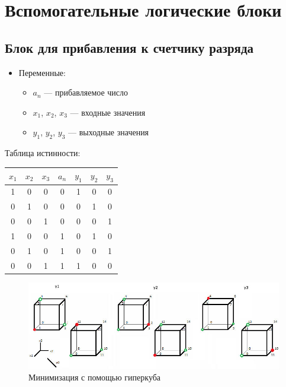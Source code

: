 \documentclass[utf8x, 12pt]{G7-32}
\begin{document}
\newpage

\section{Вспомогательные логические блоки}

\subsection{Блок для прибавления к счетчику разряда}

\begin{itemize}
	\item Переменные:
		\begin{itemize}
			\item $a_n$ --- прибавляемое число
			\item $x_1$, $x_2$, $x_3$  --- входные значения
			\item $y_1$, $y_2$, $y_3$ --- выходные значения
		\end{itemize}
			
\end{itemize}

\bigskip
Таблица истинности:

\begin{table}[hhh!]
	\begin{center}
		\begin{tabular}{|ccc|c||ccc|}
		\hline
		$x_1$ & $x_2$ & $x_3$ & $a_n$ & $y_1$ & $y_2$ & $y_3$\\
		\hline
		1 & 0 & 0 &		0 &		 1 & 0 & 0  \\
		0 &	1 & 0 &		0 &		 0 & 1 & 0 \\
		0 & 0 & 1 &		0 &		 0 & 0 & 1 \\
		\hline
		1 &	0 & 0 &		1 &		 0 & 1 & 0 \\
		0 &	1 & 0 &		1 &		 0 & 0 & 1 \\	
		0 &	0 & 1 &		1 &		 1 & 0 & 0 \\
		\hline
		\end{tabular}
	\end{center}	
\end{table}

\begin{figure}[hhh!]
\begin{center}
\includegraphics[width=16cm]{img/sum_kubs}
\end{center}
\vspace{-5mm}\caption{Минимизация с помощью гиперкуба}
\end{figure}
\end{document}
